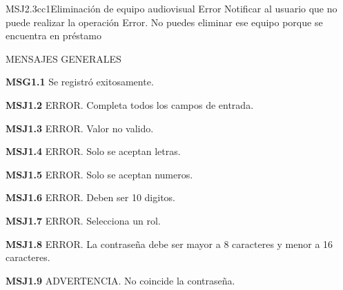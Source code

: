 	\begin{Message}{MSJ2.3cc1}{Eliminación de equipo audiovisual}
		\MSGitem[Tipo:] Error	
		\MSGitem[Objetivo: ] Notificar al usuario que no puede realizar la operación
		\MSGitem[Redacción: ] Error. No puedes eliminar ese equipo porque se encuentra en préstamo
	\end{Message}
	

MENSAJES GENERALES
	\begin{Citemize}
	\item {\bf MSG1.1} Se registró exitosamente.
	\end{Citemize}
	
	\begin{Citemize}
	\item {\bf MSJ1.2} ERROR. Completa todos los campos de entrada.
	\end{Citemize}
	
	\begin{Citemize}
	\item {\bf MSJ1.3} ERROR. Valor no valido.
	\end{Citemize}
	
	\begin{Citemize}
	\item {\bf MSJ1.4} ERROR. Solo se aceptan letras.
	\end{Citemize}
	
	\begin{Citemize}
	\item {\bf MSJ1.5} ERROR. Solo se aceptan numeros.
	\end{Citemize}
	
	\begin{Citemize}
	\item {\bf MSJ1.6} ERROR. Deben ser 10 digitos.
	\end{Citemize}
	
	\begin{Citemize}
	\item {\bf MSJ1.7} ERROR. Selecciona un rol.
	\end{Citemize}
	
	\begin{Citemize}
	\item {\bf MSJ1.8} ERROR. La contraseña debe ser mayor a 8 caracteres y menor a 16 caracteres.
	\end{Citemize}
	
	\begin{Citemize}
	\item {\bf MSJ1.9} ADVERTENCIA. No coincide la contraseña.
	\end{Citemize}
	
